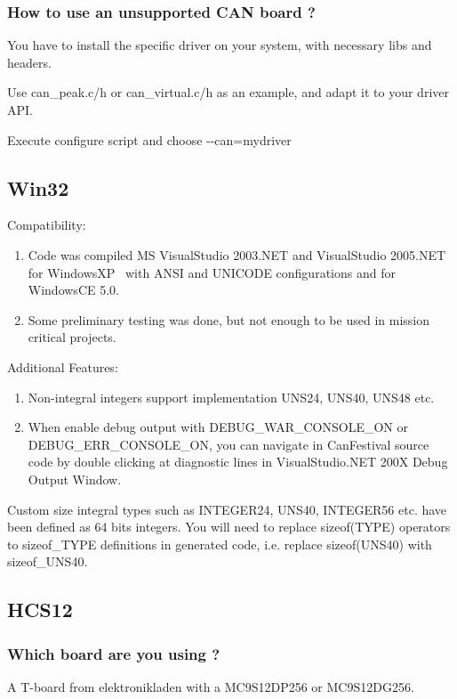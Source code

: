 \documentclass[12pt,twoside]{article}
\newcommand\liststyleLxi{%
\renewcommand\labelitemi{{--}}
\renewcommand\labelitemii{{--}}
\renewcommand\labelitemiii{{--}}
\renewcommand\labelitemiv{{--}}
}
\newcommand\liststyleLxii{%
\renewcommand\labelitemi{{--}}
\renewcommand\labelitemii{{--}}
\renewcommand\labelitemiii{{--}}
\renewcommand\labelitemiv{{--}}
}
\begin{document}
\subsubsection{How to use an unsupported CAN board ?}
You have to install the specific driver on your system, with necessary
libs and headers. 

Use can\_peak.c/h or can\_virtual.c/h as an example, and adapt it to
your driver API.

Execute configure script and choose {}-{}-can=mydriver

\subsection{Win32}
Compatibility:

\liststyleLxi
\begin{enumerate}
\item Code was compiled MS VisualStudio 2003.NET and VisualStudio
2005.NET for WindowsXP \ with ANSI and UNICODE configurations and for
WindowsCE 5.0. 
\item Some preliminary testing was done, but not enough to be used in
mission critical projects.
\end{enumerate}
Additional Features:

\liststyleLxii
\begin{enumerate}
\item Non{}-integral integers support implementation UNS24, UNS40, UNS48
etc.
\item When enable debug output with DEBUG\_WAR\_CONSOLE\_ON or
DEBUG\_ERR\_CONSOLE\_ON, you can navigate in CanFestival source code by
double clicking at diagnostic lines in VisualStudio.NET 200X Debug
Output Window.
\end{enumerate}
Custom size integral types such as INTEGER24, UNS40, INTEGER56 etc. have
been defined as 64 bits integers. You will need to replace sizeof(TYPE)
operators to sizeof\_TYPE definitions in generated code, i.e. replace
sizeof(UNS40) with sizeof\_UNS40.


\bigskip

\subsection{HCS12}
\subsubsection{Which board are you using ?}
A T{}-board from elektronikladen with a MC9S12DP256 or MC9S12DG256.
\end{document}
